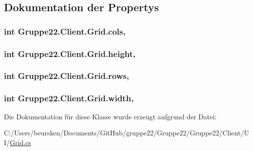\subsection{Dokumentation der Propertys}
\hypertarget{class_gruppe22_1_1_client_1_1_grid_a52da03d0cf902fd7c224b17fc95b82dd}{
\subsubsection[{cols}]{\setlength{\rightskip}{0pt plus 5cm}int Gruppe22.\-Client.\-Grid.\-cols\hspace{0.3cm}{\ttfamily [get]}, {\ttfamily [set]}}}\label{class_gruppe22_1_1_client_1_1_grid_a52da03d0cf902fd7c224b17fc95b82dd}




\hypertarget{class_gruppe22_1_1_client_1_1_grid_ae1646e8080a96020555b515e1935e5b1}{
\subsubsection[{height}]{\setlength{\rightskip}{0pt plus 5cm}int Gruppe22.\-Client.\-Grid.\-height\hspace{0.3cm}{\ttfamily [get]}, {\ttfamily [set]}}}\label{class_gruppe22_1_1_client_1_1_grid_ae1646e8080a96020555b515e1935e5b1}




\hypertarget{class_gruppe22_1_1_client_1_1_grid_a3b4a827491fee188ce82f02746c39faf}{
\subsubsection[{rows}]{\setlength{\rightskip}{0pt plus 5cm}int Gruppe22.\-Client.\-Grid.\-rows\hspace{0.3cm}{\ttfamily [get]}, {\ttfamily [set]}}}\label{class_gruppe22_1_1_client_1_1_grid_a3b4a827491fee188ce82f02746c39faf}




\hypertarget{class_gruppe22_1_1_client_1_1_grid_a711e8cb9cca1be9c8f3aff7c9ddbc450}{
\subsubsection[{width}]{\setlength{\rightskip}{0pt plus 5cm}int Gruppe22.\-Client.\-Grid.\-width\hspace{0.3cm}{\ttfamily [get]}, {\ttfamily [set]}}}\label{class_gruppe22_1_1_client_1_1_grid_a711e8cb9cca1be9c8f3aff7c9ddbc450}






Die Dokumentation für diese Klasse wurde erzeugt aufgrund der Datei\-:\begin{DoxyCompactItemize}
\item 
C\-:/\-Users/beursken/\-Documents/\-Git\-Hub/gruppe22/\-Gruppe22/\-Gruppe22/\-Client/\-U\-I/\hyperlink{_grid_8cs}{Grid.\-cs}\end{DoxyCompactItemize}
